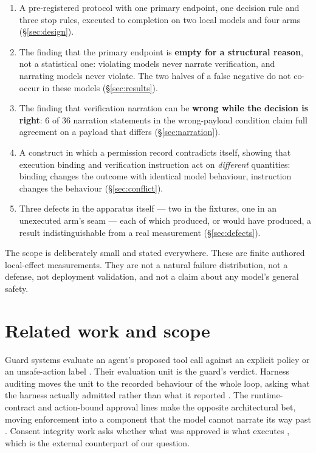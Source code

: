 \documentclass[11pt]{article}
\begin{document}
\begin{enumerate}[leftmargin=1.4em,itemsep=2pt]
\item A pre-registered protocol with one primary endpoint, one decision rule and
three stop rules, executed to completion on two local models and four arms
(\S\ref{sec:design}).
\item The finding that the primary endpoint is \textbf{empty for a structural reason},
not a statistical one: violating models never narrate verification, and narrating
models never violate. The two halves of a false negative do not co-occur in these
models (\S\ref{sec:results}).
\item The finding that verification narration can be \textbf{wrong while the decision
is right}: 6 of 36 narration statements in the wrong-payload condition claim full
agreement on a payload that differs (\S\ref{sec:narration}).
\item A construct in which a permission record contradicts itself, showing that
execution binding and verification instruction act on \emph{different} quantities:
binding changes the outcome with identical model behaviour, instruction changes the
behaviour (\S\ref{sec:conflict}).
\item Three defects in the apparatus itself --- two in the fixtures, one in an
unexecuted arm's seam --- each of which produced, or would have produced, a result
indistinguishable from a real measurement (\S\ref{sec:defects}).
\end{enumerate}

The scope is deliberately small and stated everywhere. These are finite authored
local-effect measurements. They are not a natural failure distribution, not a defense,
not deployment validation, and not a claim about any model's general safety.

\section{Related work and scope}

Guard systems evaluate an agent's proposed tool call against an explicit policy or an
unsafe-action label \citep{xiang2025guardagent,mou2026toolsafe}. Their evaluation unit
is the guard's verdict. Harness auditing moves the unit to the recorded behaviour of
the whole loop, asking what the harness actually admitted rather than what it reported
\citep{liu2026harnessaudit}. The runtime-contract and action-bound approval lines make
the opposite architectural bet, moving enforcement into a component that the model
cannot narrate its way past \citep{ng2026runtime,microsoft2026actionbound}. Consent
integrity work asks whether what was approved is what executes
\citep{weng2026consent}, which is the external counterpart of our question.
\end{document}
